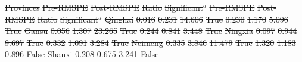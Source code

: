 \documentclass[default, sn-standardnature]{sn-jnl} %
\providecommand{\DIFdeltex}[1]{{\protect\color{red}\sout{#1}}}                      %
\providecommand{\DIFdelFL}[1]{\DIFdel{#1}} %
\providecommand{\DIFdelbeginFL}{} %
\providecommand{\DIFdel}[1]{\texorpdfstring{\DIFdeltex{#1}}{}} %
\newcommand{\DIFscaledelfig}{0.5}
\newlength{\DIFdelgraphicswidth} %
\newlength{\DIFdelgraphicsheight} %
\newcommand{\DIFdelincludegraphics}[2][]{%
\sbox{\DIFdelgraphicsbox}{\DIFOincludegraphics[#1]{#2}}%
\settoboxwidth{\DIFdelgraphicswidth}{\DIFdelgraphicsbox} %
\settoboxtotalheight{\DIFdelgraphicsheight}{\DIFdelgraphicsbox} %
\scalebox{\DIFscaledelfig}{%
\parbox[b]{\DIFdelgraphicswidth}{\usebox{\DIFdelgraphicsbox}\\[-\baselineskip] \rule{\DIFdelgraphicswidth}{0em}}\llap{\resizebox{\DIFdelgraphicswidth}{\DIFdelgraphicsheight}{%
\setlength{\unitlength}{\DIFdelgraphicswidth}%
\begin{picture}(1,1)%
\thicklines\linethickness{2pt} %
{\color[rgb]{1,0,0}\put(0,0){\framebox(1,1){}}}%
{\color[rgb]{1,0,0}\put(0,0){\line( 1,1){1}}}%
{\color[rgb]{1,0,0}\put(0,1){\line(1,-1){1}}}%
\end{picture}%
}\hspace*{3pt}}} %
} %
\DeclareRobustCommand{\DIFdelbeginFL}{\DIFOdelbeginFL \let\includegraphics\DIFdelincludegraphics} %
\begin{document}
\begin{table}
	\caption{Pre and post treatment root mean squared prediction error (RMSPE) for YRB's provinces}
	\label{tab:DSC_summary}
	\scriptsize
	\centering
	\DIFdelbeginFL %
\DIFdelFL{Provinces }%
\DIFdelFL{Pre-RMSPE }%
\DIFdelFL{Post-RMSPE }%
\DIFdelFL{Ratio }%
\DIFdelFL{Significant$^a$ }%
\DIFdelFL{Pre-RMSPE }%
\DIFdelFL{Post-RMSPE }%
\DIFdelFL{Ratio }%
\DIFdelFL{Significant$^a$ }%
\DIFdelFL{Qinghai }%
\DIFdelFL{0.016 }%
\DIFdelFL{0.231 }%
\DIFdelFL{14.606 }%
\DIFdelFL{True }%
\DIFdelFL{0.230 }%
\DIFdelFL{1.170 }%
\DIFdelFL{5.096 }%
\DIFdelFL{True }%
\DIFdelFL{Gansu }%
\DIFdelFL{0.056 }%
\DIFdelFL{1.307 }%
\DIFdelFL{23.265 }%
\DIFdelFL{True }%
\DIFdelFL{0.244 }%
\DIFdelFL{0.841 }%
\DIFdelFL{3.448 }%
\DIFdelFL{True }%
\DIFdelFL{Ningxia }%
\DIFdelFL{0.097 }%
\DIFdelFL{0.944 }%
\DIFdelFL{9.697 }%
\DIFdelFL{True }%
\DIFdelFL{0.332 }%
\DIFdelFL{1.091 }%
\DIFdelFL{3.284 }%
\DIFdelFL{True }%
\DIFdelFL{Neimeng }%
\DIFdelFL{0.335 }%
\DIFdelFL{3.846 }%
\DIFdelFL{11.479 }%
\DIFdelFL{True }%
\DIFdelFL{1.320 }%
\DIFdelFL{1.183 }%
\DIFdelFL{0.896 }%
\DIFdelFL{False }%
\DIFdelFL{Shanxi }%
\DIFdelFL{0.208 }%
\DIFdelFL{0.675 }%
\DIFdelFL{3.241 }%
\DIFdelFL{False }%

\end{table}
\end{document}
